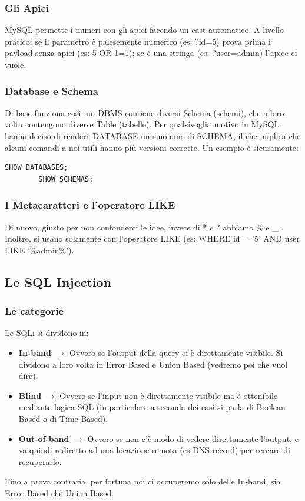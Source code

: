 \documentclass[12pt,a4paper]{report}
\begin{document}
	\subsubsection{Gli Apici}
	MySQL permette i numeri con gli apici facendo un cast automatico. A livello pratico: se il parametro è palesemente numerico (es: ?id=5) prova prima i payload senza apici (es: 5 OR 1=1); se è una stringa (es: ?user=admin) l'apice ci vuole.
	
	\subsubsection{Database e Schema}
	Di base funziona così: un DBMS contiene diversi Schema (schemi), che a loro volta contengono diverse Table (tabelle). Per qualsivoglia motivo in MySQL hanno deciso di rendere DATABASE un sinonimo di SCHEMA, il che implica che alcuni comandi a noi utili hanno più versioni corrette. Un esempio è sicuramente:
	\begin{lstlisting}[language=SQL]
		SHOW DATABASES;
		SHOW SCHEMAS;
	\end{lstlisting}
	
	\subsubsection{I Metacaratteri e l'operatore LIKE}
	Di nuovo, giusto per non confonderci le idee, invece di * e ? abbiamo \% e \_ . Inoltre, si usano solamente con l'operatore LIKE (es: WHERE id = '5' AND user LIKE '\%admin\%').
	
	\subsection{Le SQL Injection}
	
	\subsubsection{Le categorie}
	Le SQLi si dividono in:
	\begin{itemize}
		\item \textbf{In-band} $\rightarrow$ Ovvero se l'output della query ci è direttamente visibile. Si dividono a loro volta in Error Based e Union Based (vedremo poi che vuol dire).
		\item \textbf{Blind} $\rightarrow$ Ovvero se l'input non è direttamente visibile ma è ottenibile mediante logica SQL (in particolare a seconda dei casi si parla di Boolean Based o di Time Based).
		\item \textbf{Out-of-band} $\rightarrow$ Ovvero se non c'è modo di vedere direttamente l'output, e va quindi rediretto ad una locazione remota (es DNS record) per cercare di recuperarlo. 
	\end{itemize}
	Fino a prova contraria, per fortuna noi ci occuperemo solo delle In-band, sia Error Based che Union Based.
	
\end{document}
